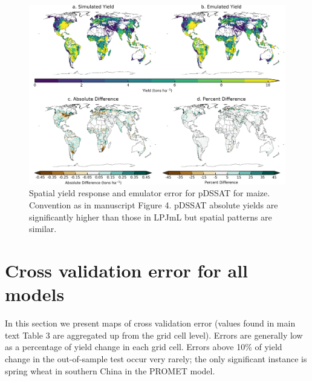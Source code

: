 \documentclass[12pt]{article}
\begin{document}
\begin{figure}[h!]
  \includegraphics[width=\textwidth]{pdssat_maize.png}
  \caption{Spatial yield response and emulator error for pDSSAT for maize. Convention as in manuscript Figure 4. pDSSAT absolute yields are significantly higher than those in LPJmL but spatial patterns are similar.}
  \label{fig:lpjmlrice}
\end{figure}

\clearpage
\section{Cross validation error for all models}
\begin{justify}
In this section we present maps of cross validation error (values found in main text Table 3 are aggregated up from the grid cell level). Errors are generally low as a percentage of yield change in each grid cell.
Errors above 10\% of yield change in the out-of-sample test occur very rarely; the only significant instance is spring wheat in southern China in the PROMET model.
\end{justify}
\end{document}
